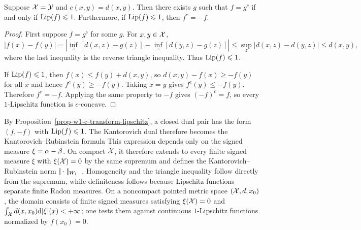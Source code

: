 \begin{prop}\label{prop-w1-c-transform-lipschitz}
	Suppose $\mathcal{X}=\mathcal{Y}$ and $c(x,y)=d(x,y)$. Then there exists $g$ such that $f=g^c$ if and only if $\operatorname{Lip}(f)\leqslant1$. Furthermore, if $\operatorname{Lip}(f)\leqslant1$, then $f^c=-f$.
\end{prop}
\begin{proof}
	First suppose $f=g^c$ for some $g$. For $x,y\in\mathcal{X}$,
	\[
		|f(x)-f(y)|
		=
		\left|\inf_z[d(x,z)-g(z)]-\inf_z[d(y,z)-g(z)]\right|
		\leq
		\sup_z |d(x,z)-d(y,z)|
		\leq d(x,y),
	\]
	where the last inequality is the reverse triangle inequality. Thus $\operatorname{Lip}(f)\leqslant1$.

	If $\operatorname{Lip}(f)\leqslant1$, then $f(x)\leq f(y)+d(x,y)$, so $d(x,y)-f(x)\geq -f(y)$ for all $x$ and hence $f^c(y)\geq -f(y)$. Taking $x=y$ gives $f^c(y)\leq -f(y)$. Therefore $f^c=-f$. Applying the same property to $-f$ gives $(-f)^c=f$, so every $1$-Lipschitz function is $c$-concave.
\end{proof}

By Proposition~\ref{prop-w1-c-transform-lipschitz}, a closed dual pair has the form $(f,-f)$ with $\operatorname{Lip}(f)\leqslant1$. The Kantorovich dual therefore becomes the Kantorovich--Rubinstein formula
This expression depends only on the signed measure $\xi=\alpha-\beta$. On compact $\mathcal{X}$, it therefore extends to every finite signed measure $\xi$ with $\xi(\mathcal{X})=0$ by the same supremum and defines the Kantorovich--Rubinstein norm $|\!| \cdot |\!|_{W_1}$~\cite{kantorovich1958space}. Homogeneity and the triangle inequality follow directly from the supremum, while definiteness follows because Lipschitz functions separate finite Radon measures. On a noncompact pointed metric space $(\mathcal{X},d,x_0)$, the domain consists of finite signed measures satisfying
$\xi(\mathcal{X})=0$ and $\int_{\mathcal{X}} d(x,x_0)\mathrm{d}|\xi|(x)<+\infty$; one tests them against continuous $1$-Lipschitz functions normalized by $f(x_0)=0$.

